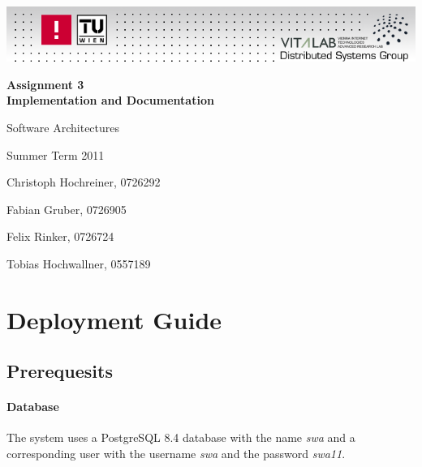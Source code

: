 \documentclass[a4paper]{article}
\begin{document}
\pagestyle{fancy}
\fancyfoot{}
\fancyhead{}
\fancyfoot[C]{\thepage}
\renewcommand{\headrulewidth}{0.0pt}

\begin{center}
\includegraphics[width=1.0\textwidth]{logo}

\vspace{3cm}

\huge \textsf{\textbf{Assignment 3\\Implementation and Documentation}}

\vspace{1ex}

\Large \rm{Software Architectures}

\vspace{1ex}

\Large \rm{Summer Term 2011}

\vspace{1ex}

\normalsize Christoph Hochreiner, 0726292

\normalsize Fabian Gruber, 0726905

\normalsize Felix Rinker, 0726724

\normalsize Tobias Hochwallner, 0557189

\end{center}
\pagebreak


\tableofcontents


\pagebreak

\section{Deployment Guide}

\subsection{Prerequesits}

\paragraph{Database}
The system uses a PostgreSQL 8.4 database with the name \emph{swa} and a corresponding user with the username \emph{swa} and the password \emph{swa11}.
\end{document}
